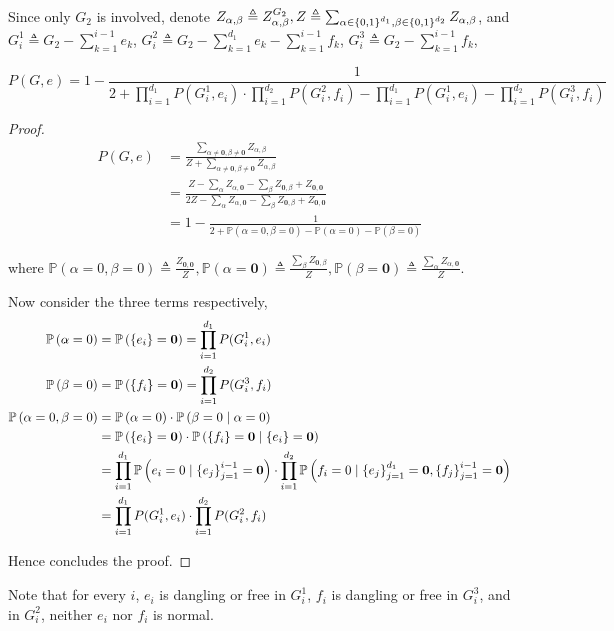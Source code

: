 Since only $G_2$ is involved, denote $Z_{\alpha, \beta} \triangleq Z_{\alpha, \beta}^{G_2}, Z \triangleq \sum_{\alpha \in \left\{0,1\right\}^{d_1} , \beta \in \left\{0,1\right\}^{d_2}} Z_{\alpha, \beta}$,
and 
$G_i^1 \triangleq G_2 - \sum_{k=1}^{i-1} e_k$,
$G_i^2 \triangleq G_2 - \sum_{k=1}^{d_1}e_k - \sum_{k=1}^{i-1} f_k$,
$G_i^3 \triangleq G_2 - \sum_{k=1}^{i-1} f_k$,


\begin{Prop}
	
	\[P(G,e) =  1 - \frac{1}{2 + \prod_{i=1}^{d_1} P(G_i^1, e_i) \cdot \prod_{i=1}^{d_2} P(G_i^2, f_i) - \prod_{i=1}^{d_1} P(G_i^1, e_i) - \prod_{i=1}^{d_2} P(G_i^3, f_i)}\]

\end{Prop}
\begin{proof}

	\begin{align*}
P(G,e) &= \frac{\sum_{\alpha \neq \mathbf{0}, \beta \neq \mathbf{0}} Z_{\alpha, \beta}}{Z + \sum_{\alpha \neq \mathbf{0}, \beta \neq \mathbf{0}} Z_{\alpha, \beta}} \\
&=\frac{Z - \sum_{\alpha}Z_{\alpha,\mathbf{0}} - \sum_{\beta} Z_{\mathbf{0}, \beta} + Z_{\mathbf{0}, \mathbf{0}}}{2Z - \sum_{\alpha}Z_{\alpha,\mathbf{0}} - \sum_{\beta} Z_{\mathbf{0}, \beta} + Z_{\mathbf{0}, \mathbf{0}}} \\
&= 1 - \frac{1}{2 + \mathbb{P}\left( \alpha = 0, \beta = 0 \right) - \mathbb{P} \left( \alpha = 0 \right) - \mathbb{P} \left( \beta = 0 \right)}
	\end{align*}

where $\mathbb{P} \left( \alpha = 0, \beta = 0 \right) \triangleq \frac{Z_{\mathbf{0},\mathbf{0}}}{Z}, \mathbb{P} \left( \alpha = \mathbf{0} \right) \triangleq \frac{\sum_{\beta} Z_{\mathbf{0}, \beta} }{Z}, \mathbb{P} \left( \beta = \mathbf{0} \right) \triangleq \frac{\sum_{\alpha} Z_{ \alpha , \mathbf{0}} }{Z}$.

Now consider the three terms respectively,
	\begin{align*}
		\mathbb{P}\left( \alpha = 0\right) &= \mathbb{P} \left( \left\{e_i\right\} = \mathbf{0}\right) =	\prod_{i=1}^{d_1} P(G_i^1, e_i) \\
		\mathbb{P}\left( \beta = 0\right) &= \mathbb{P} \left( \left\{f_i\right\} = \mathbf{0}\right) =	\prod_{i=1}^{d_2} P(G_i^3, f_i) \\
		\mathbb{P}\left( \alpha = 0, \beta = 0 \right) &=  \mathbb{P} \left( \alpha = 0 \right) \cdot \mathbb{P}\left( \beta = 0 \mid \alpha = 0 \right) \\
		&=  \mathbb{P} \left( \left\{e_i\right\} = \mathbf{0}\right) \cdot \mathbb{P} \left( \left\{f_i\right\} = \mathbf{0} \mid \left\{e_i\right\} = \mathbf{0} \right) \\
		&= \prod_{i=1}^{d_1} \mathbb{P} \left( e_i = 0 \mid \left\{e_j\right\}_{j=1}^{i-1} = \mathbf{0} \right) \cdot \prod_{i=1}^{d_2} \mathbb{P} \left( f_i = 0 \mid \left\{e_j\right\}_{j=1}^{d_1} = \mathbf{0},\left\{f_j\right\}_{j=1}^{i-1} = \mathbf{0} \right) \\
		&= \prod_{i=1}^{d_1} P(G_i^1, e_i) \cdot \prod_{i=1}^{d_2} P(G_i^2, f_i)
	\end{align*}

	Hence concludes the proof.
\end{proof}

Note that for every $i$, $e_i$ is dangling or free in $G_i^1$, $f_i$ is dangling or free in $G_i^3$, and in $G_i^2$, neither $e_i$ nor $f_i$ is normal.

